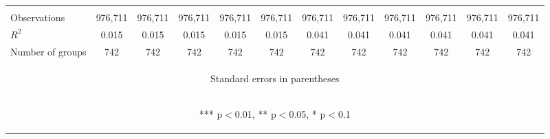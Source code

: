 \documentclass[]{article}
\begin{document}
\begin{center}
\begin{tabular}{lccccccccccc}
\vspace{4pt} & \begin{footnotesize}\end{footnotesize} & \begin{footnotesize}\end{footnotesize} & \begin{footnotesize}\end{footnotesize} & \begin{footnotesize}\end{footnotesize} & \begin{footnotesize}\end{footnotesize} & \begin{footnotesize}\end{footnotesize} & \begin{footnotesize}\end{footnotesize} & \begin{footnotesize}\end{footnotesize} & \begin{footnotesize}\end{footnotesize} & \begin{footnotesize}\end{footnotesize} & \begin{footnotesize}\end{footnotesize} \\
Observations & 976,711 & 976,711 & 976,711 & 976,711 & 976,711 & 976,711 & 976,711 & 976,711 & 976,711 & 976,711 & 976,711 \\
$R^2$ & 0.015 & 0.015 & 0.015 & 0.015 & 0.015 & 0.041 & 0.041 & 0.041 & 0.041 & 0.041 & 0.041 \\
 Number of groups & 742 & 742 & 742 & 742 & 742 & 742 & 742 & 742 & 742 & 742 & 742 \\ \hline
\multicolumn{12}{c}{\begin{footnotesize} Standard errors in parentheses\end{footnotesize}} \\
\multicolumn{12}{c}{\begin{footnotesize} *** p$<$0.01, ** p$<$0.05, * p$<$0.1\end{footnotesize}} \\
\end{tabular}
\end{center}
\end{document}
